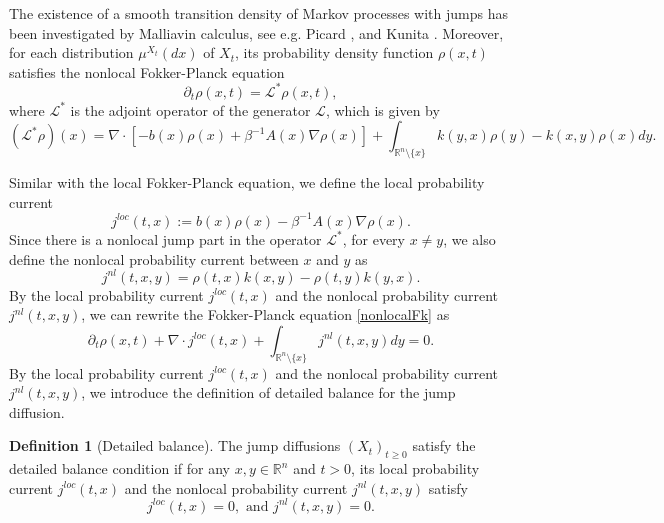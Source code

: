 \documentclass[10pt]{article}
\theoremstyle{definition}
\newtheorem{defn}{Definition}[section]
\theoremstyle{remark}
\numberwithin{equation}{section}
\begin{document}
The existence of a smooth transition density of Markov processes with jumps has been investigated by Malliavin calculus, see e.g. Picard \cite{P96}, and Kunita \cite[Chapter 6]{K19}.
Moreover, for each distribution $\mu^{X_t}(dx)$ of $X_t$, its probability density function $\rho(x,t)$ satisfies the nonlocal Fokker-Planck equation
\begin{equation}\label{nonlocalFk}
    \partial_t \rho(x,t) = \mathcal{L}^{\ast}\rho(x,t),
\end{equation}
where $\mathcal{L}^{\ast}$ is the adjoint operator of the generator $\mathcal{L}$, which is given by
\begin{equation*}
    (\mathcal{L}^{\ast}\rho)(x) = \nabla\cdot [-b(x)\rho(x) + \beta^{-1} A(x)\nabla \rho(x)] +\int_{\mathbb{R}^n \setminus \{ x \} }k(y,x)\rho(y) - k(x,y)\rho(x)dy.
\end{equation*}



Similar with the local Fokker-Planck equation, we define the local probability current
\begin{equation}
    j^{loc}(t,x) := b(x)\rho(x) - \beta^{-1} A(x)\nabla \rho(x).
\end{equation}
Since there is a nonlocal jump part in the operator $\mathcal{L}^{\ast}$, for every $x \neq y$, we also define the nonlocal probability current between $x$ and $y$ as
\begin{equation}
    j^{nl}(t,x,y) = \rho(t,x)k(x,y) - \rho(t,y)k(y,x).
\end{equation}
By the local probability current $j^{loc}(t,x)$ and the nonlocal probability current $j^{nl}(t,x,y)$, we can rewrite the Fokker-Planck equation \eqref{nonlocalFk} as
\begin{equation*}
    \partial_t \rho(x,t) + \nabla\cdot j^{loc}(t,x) + \int_{\mathbb{R}^n \setminus \{x\}} j^{nl}(t,x,y) dy=0.
\end{equation*}
By the local probability current $j^{loc}(t,x)$ and the nonlocal probability current $j^{nl}(t,x,y)$, we introduce the definition of detailed balance for the jump diffusion.

\begin{defn}[Detailed balance]
The jump diffusions $(X_t)_{t\geq 0}$ satisfy the detailed balance condition if for any $x,y \in \mathbb{R}^n$ and $t>0$, its local probability current $j^{loc}(t,x)$ and the nonlocal probability current $j^{nl}(t,x,y)$ satisfy
\begin{equation*}
    j^{loc}(t,x)=0, \text{ and }  j^{nl}(t,x,y) = 0.
\end{equation*}
\end{defn}
\end{document}
